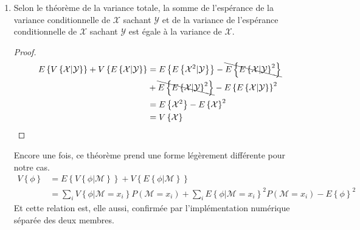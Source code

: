 \documentclass[a4paper, 12pt]{article}
\newcommand{\X}{\mathcal{X}}
\newcommand{\Y}{\mathcal{Y}}
\newcommand{\M}{\mathcal{M}}
\begin{document}
\begin{enumerate}[label=\roman*.]
\begin{proof}
\begin{align}
			                                      & = E\left\{\X\right\}
		\end{align}
	\end{proof}
	Pour notre problème, ce théorème prend une forme légèrement différente.
	\begin{align*}
		E\left\{\phi\right\} & = E\left\{E\left\{\phi|\M\right\}\right\}            \\
		                     & = \sum_{i} E\left\{\phi|\M = x_i\right\} P(\M = x_i)
	\end{align*}
	En implémentant séparément les deux membres de cette relation, on s'aperçoit qu'elle est vérifiée.
	\item Selon le théorème de la variance totale, la somme de l'espérance de la variance conditionnelle de $\X$ sachant $\Y$ et de la variance de l'espérance conditionnelle de $\X$ sachant $\Y$ est égale à la variance de $\X$.
	\begin{proof}
		\begin{align}
			E\left\{V\left\{\X|\Y\right\}\right\} + V\left\{E\left\{\X|\Y\right\}\right\} & = E\left\{E\left\{\X^2|\Y\right\}\right\} - \bcancel{E\left\{E\left\{\X|\Y\right\}^2\right\}} {\nonumber} \\
			                                                                              & + \bcancel{E\left\{E\left\{\X|\Y\right\}^2\right\}} - E\left\{E\left\{\X|\Y\right\}\right\}^2 {\nonumber} \\
			                                                                              & = E\left\{\X^2\right\} - E\left\{\X\right\}^2 {\nonumber}                                                 \\
			                                                                              & = V\left\{\X\right\}
		\end{align}
	\end{proof}
	Encore une fois, ce théorème prend une forme légèrement différente pour notre cas.
	\begin{align*}
		V\left\{\phi\right\} & = E\left\{V\left\{\phi|\M\right\}\right\} + V\left\{E\left\{\phi|\M\right\}\right\}                                                  \\
		                     & = \sum_{i} V\left\{\phi|\M = x_i\right\} P(\M = x_i) + \sum_{i} E\left\{\phi|\M = x_i\right\}^2 P(\M = x_i) - E\left\{\phi\right\}^2
	\end{align*}
	Et cette relation est, elle aussi, confirmée par l'implémentation numérique séparée des deux membres.
\end{enumerate}
\end{document}

